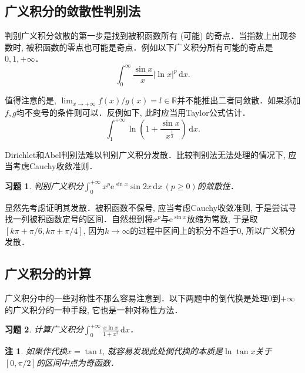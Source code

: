 \documentclass[11pt,a4paper]{ctexart}
\makeatletter
\theoremstyle{thmseries} %
\theoremstyle{exerseries}
\newtheorem{exer}{习题}[section]
\newtheorem*{rem}{注}
\renewenvironment{proof}[1][\proofname]{\par
  \pushQED{\qed}%
  \normalfont \topsep6\p@\@plus6\p@\relax
  \trivlist
  \item[\hskip\labelsep
        \itshape
    #1\@addpunct{}]\ignorespaces
}{%
  \popQED\endtrivlist\@endpefalse
}
\newenvironment{sol}{\begin{proof}[\bfseries\upshape 解\quad]}{\end{proof}}
\newcommand{\bra}[1]{\mathopen{}\left(#1\right)}
\newcommand{\sbra}[1]{\mathopen{}\left[#1\right]}
\newcommand{\R}{\mathbb{R}}
\renewcommand{\d}{\mathrm{d}}
\newcommand{\e}{\mathrm{e}}
\makeatother
\begin{document}
\subsection{广义积分的敛散性判别法}
判别广义积分敛散的第一步是找到被积函数所有 (可能) 的奇点．当指数上出现参数时, 被积函数的零点也可能是奇点．例如以下广义积分所有可能的奇点是$0,1,+\infty$．
\[\int_{0}^{\infty}\frac{\sin x}{x}|\ln x|^p\,\d x.\]


值得注意的是, $\lim_{x\to+\infty}f(x)/g(x)=l\in\R$并不能推出二者同敛散．如果添加$f,g$均不变号的条件则可以．反例如下, 此时应当用Taylor公式估计．
\[\int_{1}^{+\infty}\ln\bra{1+\frac{\sin x}{x^\frac{1}{2}}}\,\d x.\]

Dirichlet和Abel判别法难以判别广义积分发散．比较判别法无法处理的情况下, 应当考虑Cauchy收敛准则．
\begin{exer}
	判别广义积分$\int_{0}^{+\infty}x^p\e^{\sin x}\sin 2x\,\d x\,(p\geq0)$的敛散性．
\end{exer}
\begin{sol}
	显然先考虑证明其发散．被积函数不保号, 应当考虑Cauchy收敛准则, 于是尝试寻找一列被积函数定号的区间．自然想到将$x^p$与$\e^{\sin x}$放缩为常数, 于是取$[k\pi+\pi/6,k\pi+\pi/4]$, 因为$k\to\infty$的过程中区间上的积分不趋于$0$, 所以广义积分发散．
\end{sol}


\subsection{广义积分的计算}
广义积分中的一些对称性不那么容易注意到．以下两题中的倒代换是处理$0$到$+\infty$的广义积分的一种手段, 它也是一种对称性方法．
\begin{exer}
	计算广义积分$\int_{0}^{+\infty}\frac{x\ln x}{1+x^2}\,\d x$．
\end{exer}
\begin{rem}
	如果作代换$x=\tan t$, 就容易发现此处倒代换的本质是$\ln\tan x$关于$[0,\pi/2]$的区间中点为奇函数．
\end{rem}
\end{document}
